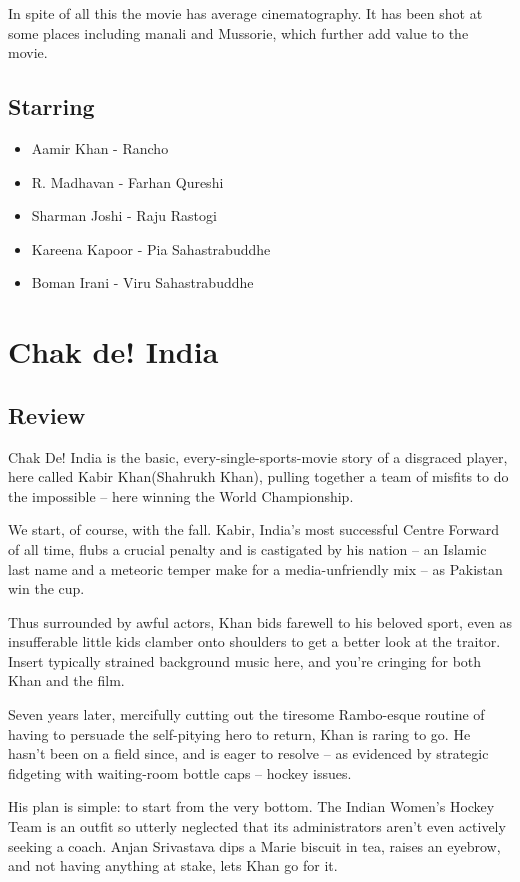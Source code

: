 \documentclass[11pt]{article} %
\begin{document}
In spite of all this the movie has average cinematography. It has been shot at some places including manali and Mussorie, which further add value to the movie.

\subsection{Starring}
\begin{itemize}
	\item Aamir Khan - Rancho
	\item R. Madhavan - Farhan Qureshi
	\item Sharman Joshi - Raju Rastogi
	\item Kareena Kapoor - Pia Sahastrabuddhe
	\item Boman Irani - Viru Sahastrabuddhe
\end{itemize}

\section{Chak de! India}
\subsection{Review}
Chak De! India is the basic, every-single-sports-movie story of a disgraced player, here called Kabir Khan(Shahrukh Khan), pulling together a team of misfits to do the impossible -- here winning the World Championship. 

We start, of course, with the fall. Kabir, India's most successful Centre Forward of all time, flubs a crucial penalty and is castigated by his nation -- an Islamic last name and a meteoric temper make for a media-unfriendly mix -- as Pakistan win the cup.

Thus surrounded by awful actors, Khan bids farewell to his beloved sport, even as insufferable little kids clamber onto shoulders to get a better look at the traitor. Insert typically strained background music here, and you're cringing for both Khan and the film.

Seven years later, mercifully cutting out the tiresome Rambo-esque routine of having to persuade the self-pitying hero to return, Khan is raring to go. He hasn't been on a field since, and is eager to resolve -- as evidenced by strategic fidgeting with waiting-room bottle caps -- hockey issues.

His plan is simple: to start from the very bottom. The Indian Women's Hockey Team is an outfit so utterly neglected that its administrators aren't even actively seeking a coach. Anjan Srivastava dips a Marie biscuit in tea, raises an eyebrow, and not having anything at stake, lets Khan go for it.
\end{document}
